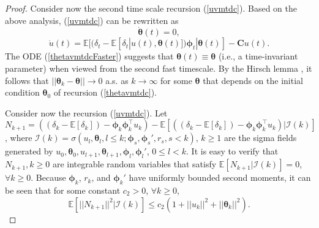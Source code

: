 \begin{proof}
    Consider now the second time scale recursion (\ref{uvmtdc}).
    Based on the above analysis, (\ref{uvmtdc}) can be rewritten as
    \begin{equation}
     \dot{{\bm{\theta}}}(t) = 0,
        \label{thetavmtdcFaster}
    \end{equation}
    \begin{equation}
     \dot{u}(t) = \mathbb{E}[(\delta_t-\mathbb{E}[\delta_t|{u}(t),{\bm{\theta}}(t)]){\bm{\phi}}_t|{\bm{\theta}}(t)] - \textbf{C}{u}(t).
        \label{uvmtdcFaster}
    \end{equation}
    The ODE (\ref{thetavmtdcFaster}) suggests that ${\bm{\theta}}(t)\equiv {\bm{\theta}}$ (i.e., a time-invariant parameter)
    when viewed from the second fast timescale.
    By the Hirsch lemma \cite{hirsch1989convergent}, it follows that
    $||{\bm{\theta}}_k-{\bm{\theta}}||\rightarrow 0$ a.s. as $k\rightarrow \infty$ for some
    ${\bm{\theta}}$ that depends on the initial condition ${\bm{\theta}}_0$ of recursion
    (\ref{thetavmtdc}). 
    
    Consider now the recursion (\ref{uvmtdc}).
    Let
    $N_{k+1}=((\delta_k-\mathbb{E}[\delta_k]) - {\bm{\phi}}_k {\bm{\phi}}^{\top}_k {u}_k) -\mathbb{E}[((\delta_k-\mathbb{E}[\delta_k]) - {\bm{\phi}}_k {\bm{\phi}}^{\top}_k {u}_k)|\mathcal{I} (k)]$,
    where $\mathcal{I}(k)=\sigma({u}_l,{\bm{\theta}}_l,l\leq k;{\bm{\phi}}_s,{\bm{\phi}}_s',r_s,s<k)$, 
    $k\geq 1$ are the sigma fields
    generated by ${u}_0,{\bm{\theta}}_0,{u}_{l+1},{\bm{\theta}}_{l+1},{\bm{\phi}}_l,{\bm{\phi}}_l'$,
    $0\leq l<k$.
    It is easy to verify that $N_{k+1},k\geq0$ are integrable random variables that 
    satisfy $\mathbb{E}[N_{k+1}|\mathcal{I}(k)]=0$, $\forall k\geq0$.
    Because ${\bm{\phi}}_k$, $r_k$, and ${\bm{\phi}}_k'$ have
    uniformly bounded second moments, it can be seen that for some constant
    $c_2>0$, $\forall k\geq0$,
    \begin{equation*}
    \mathbb{E}[||N_{k+1}||^2|\mathcal{I}(k)]\leq
    c_2(1+||{u}_k||^2+||{\bm{\theta}}_k||^2).
    \end{equation*}
    

\end{proof}
